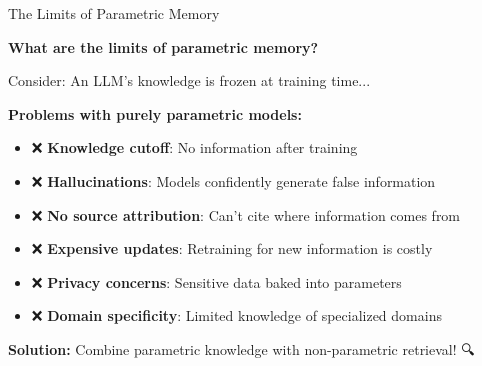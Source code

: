 \documentclass[aspectratio=169]{beamer}
\begin{document}
\begin{frame}[shrink=10]{The Limits of Parametric Memory 🧠}
\begin{discussionbox}
\textbf{What are the limits of parametric memory?}

Consider: An LLM's knowledge is frozen at training time...
\end{discussionbox}

\vspace{0.5em}

\textbf{Problems with purely parametric models:}
\begin{itemize}\setlength{\itemsep}{0pt}
    \item ❌ \textbf{Knowledge cutoff}: No information after training
    \item ❌ \textbf{Hallucinations}: Models confidently generate false information
    \item ❌ \textbf{No source attribution}: Can't cite where information comes from
    \item ❌ \textbf{Expensive updates}: Retraining for new information is costly
    \item ❌ \textbf{Privacy concerns}: Sensitive data baked into parameters
    \item ❌ \textbf{Domain specificity}: Limited knowledge of specialized domains
\end{itemize}

\vspace{0.5em}
\textbf{Solution:} Combine parametric knowledge with non-parametric retrieval! 🔍
\end{frame}
\end{document}
